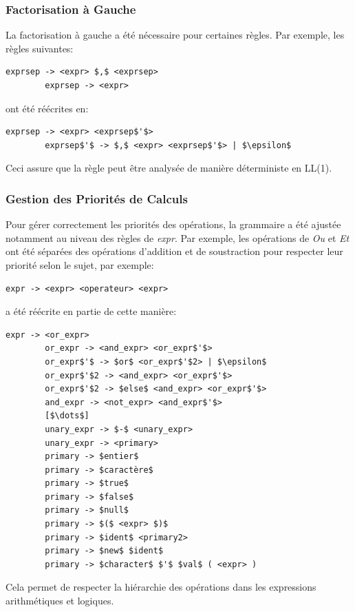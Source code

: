 \documentclass[french,a4paper]{article}
\begin{document}
    \subsubsection{Factorisation à Gauche}
    La factorisation à gauche a été nécessaire pour certaines règles.
    Par exemple, les règles suivantes:
    \begin{lstlisting}[label={lst:lstlisting4}]
        exprsep -> <expr> $,$ <exprsep>
        exprsep -> <expr>
    \end{lstlisting}
    ont été réécrites en:
    \begin{lstlisting}[label={lst:lstlisting5}]
        exprsep -> <expr> <exprsep$'$>
        exprsep$'$ -> $,$ <expr> <exprsep$'$> | $\epsilon$
    \end{lstlisting}
    Ceci assure que la règle peut être analysée de manière déterministe en LL(1).

    \subsubsection{Gestion des Priorités de Calculs}
    Pour gérer correctement les priorités des opérations, la grammaire a été ajustée notamment au niveau des règles de \textit{expr}.
    Par exemple, les opérations de \textit{Ou} et \textit{Et} ont été séparées des opérations d'addition et de soustraction pour respecter leur priorité selon le sujet, par exemple:
    \begin{lstlisting}[label={lst:lstlisting6}]
        expr -> <expr> <operateur> <expr>
    \end{lstlisting}
    a été réécrite en partie de cette manière:
    \begin{lstlisting}[label={lst:lstlisting7}]
        expr -> <or_expr>
        or_expr -> <and_expr> <or_expr$'$>
        or_expr$'$ -> $or$ <or_expr$'$2> | $\epsilon$
        or_expr$'$2 -> <and_expr> <or_expr$'$>
        or_expr$'$2 -> $else$ <and_expr> <or_expr$'$>
        and_expr -> <not_expr> <and_expr$'$>
        [$\dots$]
        unary_expr -> $-$ <unary_expr>
        unary_expr -> <primary>
        primary -> $entier$
        primary -> $caractère$
        primary -> $true$
        primary -> $false$
        primary -> $null$
        primary -> $($ <expr> $)$
        primary -> $ident$ <primary2>
        primary -> $new$ $ident$
        primary -> $character$ $'$ $val$ ( <expr> )
    \end{lstlisting}
    Cela permet de respecter la hiérarchie des opérations dans les expressions arithmétiques et logiques.
\end{document}
